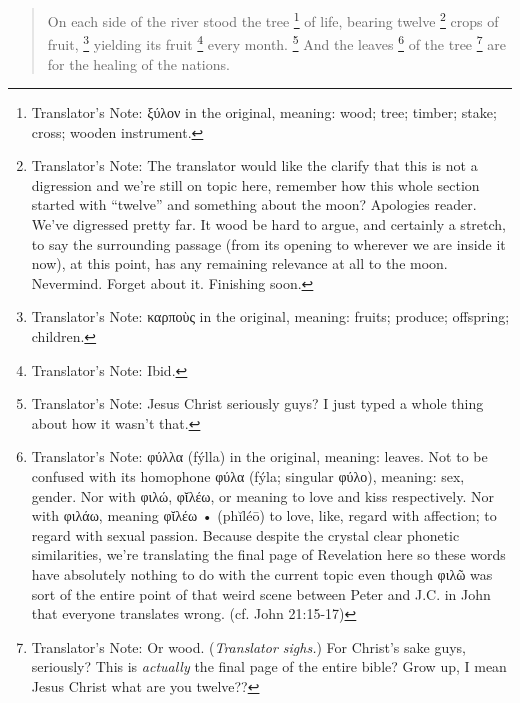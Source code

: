 {{				%
                \begin{quote}
                On each side of the river stood the tree%
                \footnote{
                    Translator's Note: ξύλον in the original, meaning: wood; tree; timber; stake; cross; wooden instrument.
                }
                of life, bearing twelve%
                \footnote{
                    Translator's Note: The translator would like the clarify that this is not a digression
                    and we're still on topic here, remember how this whole section started with ``twelve''
                    and something about the moon? Apologies reader. We've digressed pretty far.
                    It wood be hard to argue, and certainly a stretch, to say the surrounding passage
                    (from its opening to wherever we are inside it now), at this point, has any remaining
                    relevance at all to the moon. Nevermind. Forget about it. Finishing soon.
                }
                crops of fruit,%
                \footnote{
                    Translator's Note: καρποὺς in the original, meaning: fruits; produce; offspring; children.
                }
                yielding its fruit%
                \footnote{
                    Translator's Note: Ibid.
                }
                every month.%
                \footnote{
                    Translator's Note: Jesus Christ seriously guys? I just typed a whole thing about how it wasn't that.
                }
                And the leaves%
                \footnote{
                    Translator's Note: φύλλα (fýlla) in the original, meaning: leaves.
                    Not to be confused with its homophone φύλα (fýla; singular φύλο), meaning: sex, gender.
                    Nor with φιλώ, φῐλέω, or meaning to love and kiss respectively.
                    Nor with φιλάω, meaning φῐλέω • (phĭléō) to love, like, regard with affection; to regard with sexual passion.
                    Because despite the crystal clear phonetic similarities, we're translating the final page of Revelation here
                    so these words have absolutely nothing to do with the current topic even though φιλῶ was sort of the entire
                    point of that weird scene between Peter and J.C. in John that everyone translates wrong.
                    (cf. John 21:15-17)
                }
                of the tree%
                \footnote{
                    Translator's Note: Or wood. (\textsl{Translator sighs.}) For Christ's sake guys, seriously?
                    This is \textit{actually} the final page of the entire bible?
                    Grow up, I mean Jesus Christ what are you twelve??
                }
                are for the healing of the nations.
                \end{quote}

}}

